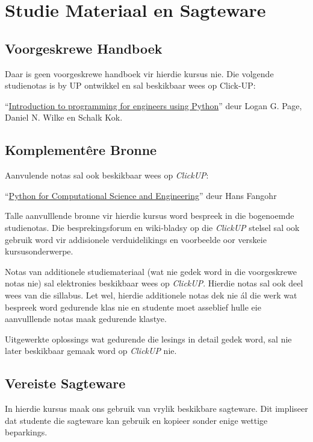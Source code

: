 \section{Studie Materiaal en Sagteware}
    \subsection{Voorgeskrewe Handboek}
        Daar is geen voorgeskrewe handboek vir hierdie kursus nie. Die volgende 
        studienotas is by UP ontwikkel en sal beskikbaar wees op Click-UP:
        
        ``\underline{Introduction to programming for engineers using
          Python}'' deur Logan G. Page, Daniel N. Wilke en Schalk Kok.
    
    \subsection{Komplement\^{e}re Bronne}
        Aanvulende notas sal ook beskikbaar wees op \textit{ClickUP}:
            
        ``\underline{Python for Computational Science and Engineering}'' deur 
        Hans Fangohr
        
        Talle aanvulllende bronne vir hierdie kursus word bespreek in die
        bogenoemde studienotas.  Die besprekingsforum en wiki-bladsy
        op die \textit{ClickUP} stelsel sal ook gebruik word vir addisionele
        verduidelikings en voorbeelde oor verskeie kursusonderwerpe. 
        
        Notas van additionele studiemateriaal (wat nie gedek word in die voorgeskrewe
        notas nie) sal elektronies beskikbaar wees op \textit{ClickUP}. Hierdie 
        notas sal ook deel wees van die sillabus.  Let wel, hierdie additionele notas 
        dek nie \'{a}l die werk wat bespreek word gedurende klas nie en studente
        moet asseblief hulle eie aanvulllende notas maak gedurende klastye.
        
        Uitgewerkte oplossings wat gedurende die lesings in detail gedek word, sal nie
        later beskikbaar gemaak word op \textit{ClickUP} nie.
        

    \subsection{Vereiste Sagteware}
	In hierdie kursus maak ons gebruik van vrylik beskikbare sagteware.
	Dit impliseer dat studente die sagteware kan gebruik en kopieer sonder
	enige wettige beparkings.

